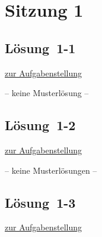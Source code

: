 \documentclass[
  11pt,
  ngerman,
  a4paper,
]{report}
\begin{document}
\hypertarget{sitzung-1}{%
\section*{Sitzung 1}\label{sitzung-1}}

\hypertarget{loesung-1-1}{%
\subsection{Lösung~1-1}\label{loesung-1-1}}

\protect\hyperlink{aufgabe-1-1}{zur Aufgabenstellung}

-- keine Musterlösung --

\hypertarget{loesung-1-2}{%
\subsection{Lösung~1-2}\label{loesung-1-2}}

\protect\hyperlink{aufgabe-1-2}{zur Aufgabenstellung}

-- keine Musterlösungen --

\hypertarget{loesung-1-3}{%
\subsection{Lösung~1-3}\label{loesung-1-3}}

\protect\hyperlink{aufgabe-1-3}{zur Aufgabenstellung}
\end{document}
